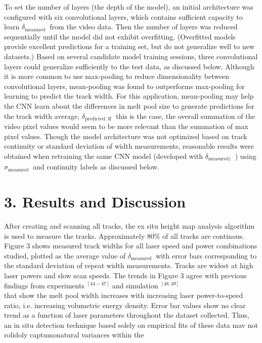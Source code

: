\documentclass[10pt]{article}
\begin{document}
To set the number of layers (the depth of the model), an initial architecture was configured with six convolutional layers, which contains sufficient capacity to learn $\delta_{\text {measured }}$ from the video data. Then the number of layers was reduced sequentially until the model did not exhibit overfitting. (Overfitted models provide excellent predictions for a training set, but do not generalize well to new datasets.) Based on several candidate model training sessions, three convolutional layers could generalize sufficiently to the test data, as discussed below. Although it is more common to use max-pooling to reduce dimensionality between convolutional layers, mean-pooling was found to outperforms max-pooling for learning to predict the track width. For this application, mean-pooling may help the CNN learn about the differences in melt pool size to generate predictions for the track width average, $\delta_{\text {predicted. If }}$ this is the case, the overall summation of the video pixel values would seem to be more relevant than the summation of max pixel values. Though the model architecture was not optimized based on track continuity or standard deviation of width measurements, reasonable results were obtained when retraining the same $\mathrm{CNN}$ model (developed with $\delta_{\text {measured) }}$ ) using $\sigma_{\text {measured }}$ and continuity labels as discussed below.

\section*{3. Results and Discussion}
After creating and scanning all tracks, the ex situ height map analysis algorithm is used to measure the tracks. Approximately $80 \%$ of all tracks are continous. Figure 3 shows measured track widths for all laser speed and power combinations studied, plotted as the average value of $\delta_{\text {measured }}$ with error bars corresponding to the standard deviation of repeat width measurements. Tracks are widest at high laser powers and slow scan speeds. The trends in Figure 3 agree with previous findings from experiments ${ }^{[44-47]}$ and simulation ${ }^{[48,49]}$\\
that show the melt pool width increases with increasing laser power-to-speed ratio, i.e. increasing volumetric energy density. Error bar values show no clear trend as a function of laser parameters throughout the dataset collected. Thus, an in situ detection technique based solely on empirical fits of these data mav not rolidoly captumonatural variances within the
\end{document}

